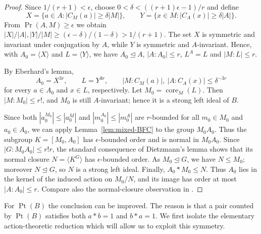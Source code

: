 \documentclass[10pt,a4paper]{amsart}
\numberwithin{equation}{section}
\newcommand{\Pt}{\operatorname{Pt} }
\renewcommand{\Pr}{\operatorname{Pr} }
\begin{document}
\begin{proof}
Since $1/(r+1)<\epsilon$, choose
$0<\delta<((r+1)\epsilon-1)/r$ and define
$$
X=\{a\in A:|C_M(a)|\geqslant\delta|M|\},
\qquad
Y=\{x\in M:|C_A(x)|\geqslant\delta|A|\}.
$$
From $\Pr(A,M)\geqslant\epsilon$ we obtain
$|X|/|A|,|Y|/|M|\geqslant(\epsilon-\delta)/(1-\delta)>1/(r+1)$.
The set $X$ is symmetric and invariant under conjugation by $A$, while
$Y$ is symmetric and $A$-invariant. Hence, with
$A_0=\langle X\rangle$ and $L=\langle Y\rangle$, we have
$A_0\unlhd A$, $|A:A_0|\leqslant r$, $L^A=L$ and $|M:L|\leqslant r$.

By Eberhard's lemma,
$$
A_0=X^{3r},\qquad L=Y^{3r},\qquad
|M:C_M(a)|,\ |A:C_A(x)|\leqslant\delta^{-3r}
$$
for every $a\in A_0$ and $x\in L$, respectively. Let
$M_0=\operatorname{core}_M(L)$. Then
$|M:M_0|\leqslant r!$, and $M_0$ is still $A$-invariant; hence it is a
strong left ideal of $B$.

Since both $|a_0^{M_0}| \le |a_0^M|$ and $|m_0^{A_0}| \le |m_0^A|$ are $r$-bounded  for all $m_0 \in M_0$ and $a_0 \in A_0$, we can apply Lemma~\ref{lem:mixed-BFC} to the group $M_0A_0$. Thus the subgroup
$K=[M_0,A_0]$ has $\epsilon$-bounded order and is normal in
$M_0A_0$. Since
$|G:M_0A_0|\leqslant r!r$, the standard consequence of Dietzmann's
lemma shows that its normal closure
$N=\langle K^G\rangle$
has $\epsilon$-bounded order. As $M_0\unlhd G$, we have $N\leqslant
M_0$; moreover $N\unlhd G$, so $N$ is a strong left ideal. Finally,
$A_0*M_0\leqslant N$. Thus $A_0$ lies in the kernel of the induced
action on $M_0/N$, and its image has order at most $|A:A_0|\leqslant r$.
Compare also the normal-closure observation in
\cite[Remark 2.6]{DS22}.
\end{proof}

For $\Pt(B)$ the conclusion can be improved. The reason is that a pair
counted by $\Pt(B)$ satisfies both $a*b=1$ and $b*a=1$. We first isolate
the elementary action-theoretic reduction which will allow us to exploit
this symmetry.
\end{document}
